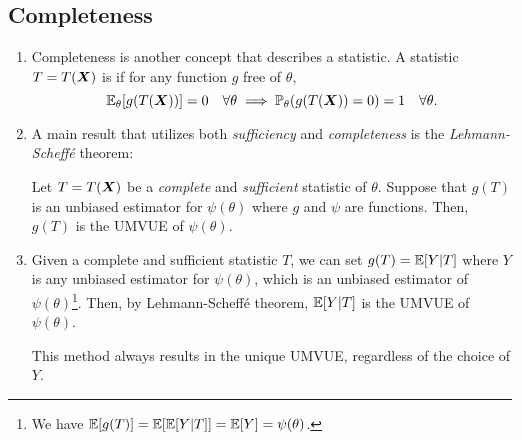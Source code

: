 \subsection{Completeness}
\begin{enumerate}
\item Completeness is another concept that describes a statistic. A statistic
\(T=T(\vb*{X})\) is  if for any function \(g\)
free of \(\theta\), 
\[
\mathbb{E}_{\theta}[g(T(\vb*{X}))]=0\quad\forall \theta
\implies
\mathbb{P}_{\theta}(g(T(\vb*{X}))=0)=1\quad\forall \theta.
\]
\item A main result that utilizes both \emph{sufficiency} and
\emph{completeness} is the \emph{Lehmann-Scheff\'{e}} theorem:
\begin{theorem}
\label{thm:lehmann-scheffe}
Let \(T=T(\vb*{X})\) be a \emph{complete} and \emph{sufficient} statistic of
\(\theta\). Suppose that \(g(T)\) is an unbiased estimator for \(\psi(\theta)\)
where \(g\) and \(\psi\) are functions.  Then, \(g(T)\) is the UMVUE of
\(\psi(\theta)\).
\end{theorem}
\item Given a complete and sufficient statistic \(T\), we can set
\(g(T)=\mathbb{E}\qty[Y|T]\) where \(Y\) is any unbiased estimator for \(\psi(\theta)\),
which is an unbiased estimator of \(\psi(\theta)\)\footnote{We have
\(\mathbb{E}\qty[g(T)]=\mathbb{E}\qty[\mathbb{E}\qty[Y|T]]=\mathbb{E}\qty[Y]=\psi(\theta)\).}. Then, by
Lehmann-Scheff\'{e} theorem, \(\mathbb{E}\qty[Y|T]\) is the UMVUE of \(\psi(\theta)\).

\begin{note}
This method always results in the unique UMVUE, regardless of the choice of
\(Y\).
\end{note}
\end{enumerate}
